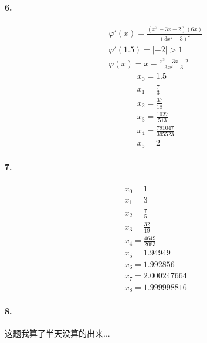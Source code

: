 \documentclass[UTF8]{ctexart}
\begin{document}
	\paragraph{6.}
	\[
	\begin{split}
		&\varphi'(x)=\frac{(x^3-3x-2)(6x)}{(3x^2-3)^2}\\
		&\varphi'(1.5)=|-2|>1\\
		&\varphi(x)=x-\frac{x^3-3x-2}{3x^2-3}
	\end{split}
	\]
	\[
	\begin{split}
		&x_0=1.5\\
		&x_1=\frac{7}{3}\\
		&x_2=\frac{37}{18}\\
		&x_3=\frac{1027}{513}\\
		&x_4=\frac{791047}{395523}\\
		&x_5=2
	\end{split}
	\]
	
	\paragraph{7.}
	\[
	\begin{split}
		&x_0=1\\
		&x_1=3\\
		&x_2=\frac{7}{5}\\
		&x_3=\frac{32}{19}\\
		&x_4=\frac{4649}{2083}\\
		&x_5=1.94949\\
		&x_6=1.992856\\
		&x_7=2.000247664\\
		&x_8=1.999998816
	\end{split}
	\]
	
	\paragraph{8.}
		这题我算了半天没算的出来...
\end{document}

